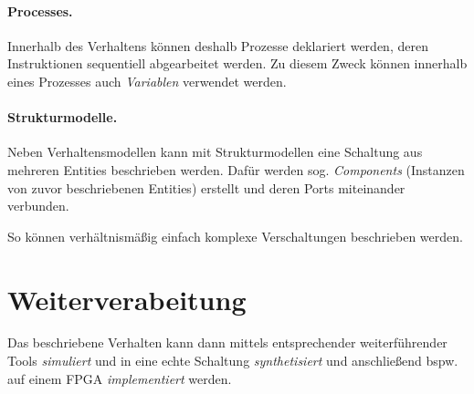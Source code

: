 \paragraph{Processes.} Innerhalb des Verhaltens können deshalb Prozesse deklariert werden, deren Instruktionen sequentiell abgearbeitet werden. Zu diesem Zweck können innerhalb eines Prozesses auch \textit{Variablen} verwendet werden.

\paragraph{Strukturmodelle.} Neben Verhaltensmodellen kann mit Strukturmodellen eine Schaltung aus mehreren Entities beschrieben werden. Dafür werden sog. \textit{Components} (Instanzen von zuvor beschriebenen Entities) erstellt und deren Ports miteinander verbunden.

So können verhältnismäßig einfach komplexe Verschaltungen beschrieben werden.
 
\section{Weiterverabeitung}
Das beschriebene Verhalten kann dann mittels entsprechender weiterführender Tools \textit{simuliert} und in eine echte Schaltung \textit{synthetisiert} und anschließend bspw. auf einem FPGA \textit{implementiert} werden.
